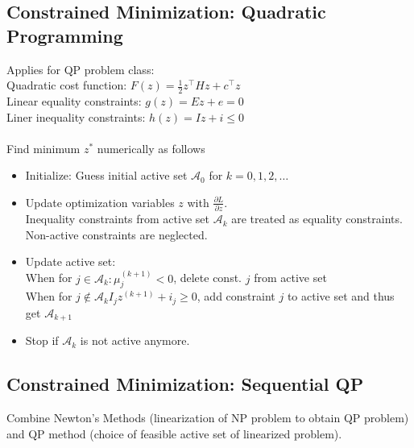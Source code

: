 \documentclass[english]{latex4ei/latex4ei_sheet}
\begin{document}
\begin{sectionbox}

\subsection{Constrained Minimization: Quadratic Programming}
Applies for QP problem class:\\
Quadratic cost function: $F(z)=\frac{1}{2}z^{\top}Hz+c^{\top}z$\\
Linear equality constraints: $g(z)=Ez+e=0$\\
Liner inequality constraints: $h(z)=Iz+i\leq 0$\\
\\
Find minimum $z^{*}$ numerically as follows
\begin{itemize}
    \item Initialize: Guess initial active set $\mathcal{A}_0$ for $k=0,1,2,\ldots$
    \item Update optimization variables $z$ with $\frac{\partial L}{\partial z}$.\\
    Inequality constraints from active set $\mathcal{A}_k$ are treated as equality constraints. Non-active constraints are neglected.
    \item Update active set:\\
    When for $j \in \mathcal{A}_{k}: \mu_{j}^{(k+1)}<0$, delete const. $j$ from active set\\
    When for $j \notin \mathcal{A}_{k} I_{j} z^{(k+1)}+i_{j} \geq 0$, add constraint $j$ to active set and thus get $\mathcal{A}_{k+1}$
    \item Stop if $\mathcal{A}_{k}$ is not active anymore.
\end{itemize}\vspace{0.2cm}

\subsection{Constrained Minimization: Sequential QP}
Combine Newton's Methods (linearization of NP problem to obtain QP problem) and QP method (choice of feasible active set of linearized problem).\\


\end{sectionbox}
\end{document}
